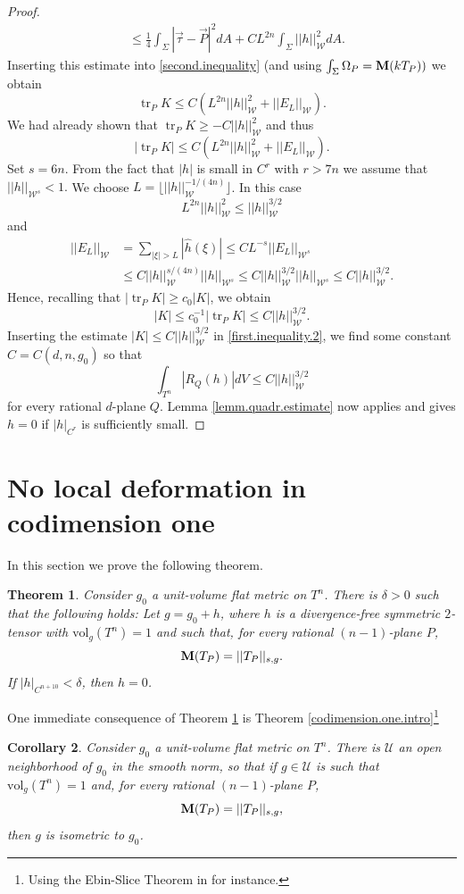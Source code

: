 \documentclass[11pt]{amsart}
\def\tr{\operatorname{tr}}
\def\vol{\mathrm{vol}}
\newtheorem{thm}{Theorem}[section]
\newtheorem{cor}[thm]{Corollary}
\theoremstyle{remark}
\theoremstyle{definition}
\begin{document}
\begin{proof}
\begin{align*}
			&\leq \frac14\int_\Sigma |\vec \tau-\vec P|^2dA+CL^{2n}\int_{\Sigma}||h||_{\mathcal W}^2dA.
		\end{align*}
		Inserting this estimate into \eqref{second.inequality}  (and using $\int_\Sigma\Omega_P={\bf M}(kT_P))$ we obtain
		$$
		\tr _PK\leq C\left(L^{2n}||h||_{\mathcal W}^2+||E_L||_{\mathcal W}\right) .%
		$$
		We had already shown that $\tr _PK\geq -C||h||^2_{\mathcal W}$ and thus
		$$|\tr _PK|\leq C\left(L^{2n}||h||_{\mathcal W}^2+||E_L||_{\mathcal W}\right).$$
		{Set  $s=6n$. From the fact that $|h|$ is small in $C^r$ with $r>7n$ we assume that $||h||_{\mathcal W^s}<1.$} We choose  $L=\lfloor ||h||_{\mathcal W}^{-1/(4n)}\rfloor$. In this case
		$$L^{2n}||h||_{\mathcal W}^2\leq ||h||_{\mathcal W}^{3/2}$$
		and
		$$
		\begin{aligned}
			||E_L||_{\mathcal W}&=\sum_{{|\xi|>L}}|\hat h(\xi)|\leq C L^{-s} ||E_L||_{\mathcal W^s}\\
			&\leq C ||h||_{\mathcal W}^{s/(4n)}||h||_{\mathcal W^s}\leq C||h||_{\mathcal W}^{3/2}||h||_{\mathcal W^s}\leq C||h||_{\mathcal W}^{3/2}.
		\end{aligned}
		$$
		Hence, recalling that $|\tr _PK|\geq c_0|K|$, we obtain
		$$
		|K|\leq c_0^{-1}|\tr _PK|\leq C||h||_{\mathcal W}^{3/2}.
		$$
		Inserting the estimate $|K|\leq C||h||_{\mathcal W}^{3/2}$ in \eqref{first.inequality.2}, we find some constant $C=C(d,n,g_0)$ so that
		$$\int_{T^n}|R_Q(h)|dV\leq  C||h||_{\mathcal W}^{3/2}$$
		for every rational $d$-plane $Q$.
		Lemma \ref{lemm.quadr.estimate} now applies and gives $h=0$ if $|h|_{C^r}$ is sufficiently small.
	\end{proof}
	
	
	
	\section{No local deformation in codimension one}\label{local.deformation.section}
	
	In this section we prove the following theorem.
	\begin{thm}\label{codimension.one.thm}
		Consider  $g_0$ a unit-volume flat metric on $T^n$. There is $\delta>0$ such that the following holds: 
		Let $g=g_0+h$, where $h$ is a divergence-free symmetric $2$-tensor with $\vol_g(T^n)=1$ and such that, for every rational $(n-1)$-plane $P$,
		$$
		{{\bf M}(T_P)=||T_P||_{s,g}.}
		$$
		If $|h|_{C^{n+10}}<\delta$, then $h=0$.
	\end{thm}
	One immediate consequence of  Theorem \ref{codimension.one.thm} is Theorem \ref{codimension.one.intro}\footnote{Using the Ebin-Slice Theorem in \cite[Proposition 11]{BM11} for instance.} 
	\begin{cor}\label{codimension.one.cor}
		Consider  $g_0$ a unit-volume flat metric on $T^n$. There is $\mathcal U$ an  open neighborhood of $g_0$ in the smooth norm, so that if $g\in \mathcal U$ is such that $\vol_g(T^n)=1$ and, for every rational $(n-1)$-plane $P$,
		$$
		{{\bf M}(T_P)=||T_P||_{s,g}},
		$$
		then $g$ is isometric to $g_0$.
	\end{cor}
\end{document}
